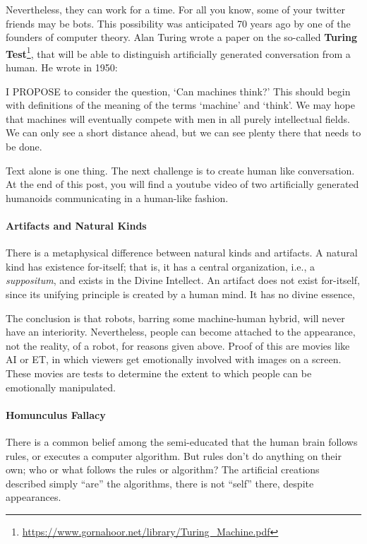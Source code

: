 Nevertheless, they can work for a time. For all you know, some of your twitter friends may be bots. This possibility was anticipated 70 years ago by one of the founders of computer theory. Alan Turing wrote a paper on the so-called \textbf{Turing Test}\footnote{\url{https://www.gornahoor.net/library/Turing\_Machine.pdf}}, that will be able to distinguish artificially generated conversation from a human. He wrote in 1950:

\begin{quotex}
I PROPOSE to consider the question, `Can machines think?' This should begin with definitions of the meaning of the terms `machine' and `think'. We may hope that machines will eventually compete with men in all purely intellectual fields. We can only see a short distance ahead, but we can see plenty there that needs to be done.
\end{quotex}

Text alone is one thing. The next challenge is to create human like conversation. At the end of this post, you will find a youtube video of two artificially generated humanoids communicating in a human-like fashion.

\paragraph{Artifacts and Natural Kinds}

There is a metaphysical difference between natural kinds and artifacts. A natural kind has existence for-itself; that is, it has a central organization, i.e., a \emph{suppositum}, and exists in the Divine Intellect. An artifact does not exist for-itself, since its unifying principle is created by a human mind. It has no divine essence,

The conclusion is that robots, barring some machine-human hybrid, will never have an interiority. Nevertheless, people can become attached to the appearance, not the reality, of a robot, for reasons given above. Proof of this are movies like AI or ET, in which viewers get emotionally involved with images on a screen. These movies are tests to determine the extent to which people can be emotionally manipulated.

\paragraph{Homunculus Fallacy}

There is a common belief among the semi-educated that the human brain follows rules, or executes a computer algorithm. But rules don't do anything on their own; who or what follows the rules or algorithm? The artificial creations described simply ``are'' the algorithms, there is not ``self'' there, despite appearances.

